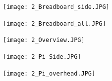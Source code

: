 \documentclass{article}
\begin{document}
\begin{figure}
\texttt{[image: 2\_Breadboard\_side.JPG]}
\end{figure}

\begin{figure}
\texttt{[image: 2\_Breadboard\_all.JPG]}
\end{figure}

\begin{figure}
\texttt{[image: 2\_Overview.JPG]}
\end{figure}

\begin{figure}
\texttt{[image: 2\_Pi\_Side.JPG]}
\end{figure}

\begin{figure}
\texttt{[image: 2\_Pi\_overhead.JPG]}
\end{figure}
\end{document}
